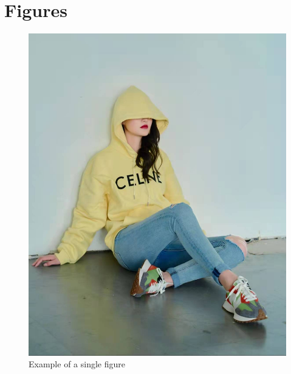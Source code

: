 \documentclass[a4paper]{article}
\begin{document}
\section{Figures}

\begin{figure}[H]
\centering
\includegraphics[width=0.4\linewidth]{images/lq0}
\caption{Example of a single figure}
\label{fig:example1}
\end{figure}
\end{document}
